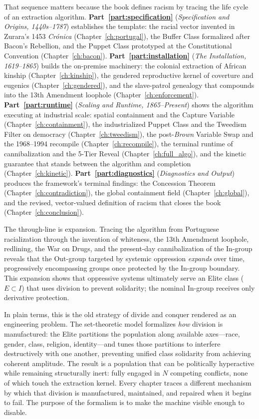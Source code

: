 \documentclass[12pt,openany]{book}
\numberwithin{equation}{chapter}
\begin{document}
That sequence matters because the book defines racism by tracing the life cycle of an extraction algorithm. \textbf{Part~\ref{part:specification}} (\textit{Specification and Origins, 1440s--1787}) establishes the template: the racial vector invented in Zurara's 1453 \textit{Crónica} (Chapter~\ref{ch:portugal}), the Buffer Class formalized after Bacon's Rebellion, and the Puppet Class prototyped at the Constitutional Convention (Chapter~\ref{ch:bacon}). \textbf{Part~\ref{part:installation}} (\textit{The Installation, 1619--1865}) builds the on-premise machinery: the colonial extraction of African kinship (Chapter~\ref{ch:kinship}), the gendered reproductive kernel of coverture and eugenics (Chapter~\ref{ch:gendered}), and the slave-patrol genealogy that compounds into the 13th Amendment loophole (Chapter~\ref{ch:enforcement}). \textbf{Part~\ref{part:runtime}} (\textit{Scaling and Runtime, 1865--Present}) shows the algorithm executing at industrial scale: spatial containment and the Capture Variable (Chapter~\ref{ch:containment}), the industrialized Puppet Class and the Tweedism Filter on democracy (Chapter~\ref{ch:tweedism}), the post-\textit{Brown} Variable Swap and the 1968--1994 recompile (Chapter~\ref{ch:recompile}), the terminal runtime of cannibalization and the 5-Tier Reveal (Chapter~\ref{ch:full_algo}), and the kinetic guarantee that stands between the algorithm and completion (Chapter~\ref{ch:kinetic}). \textbf{Part~\ref{part:diagnostics}} (\textit{Diagnostics and Output}) produces the framework's terminal findings: the Concession Theorem (Chapter~\ref{ch:contradiction}), the global containment field (Chapter~\ref{ch:global}), and the revised, vector-valued definition of racism that closes the book (Chapter~\ref{ch:conclusion}).

The through-line is expansion. Tracing the algorithm from Portuguese racialization through the invention of whiteness, the 13th Amendment loophole, redlining, the War on Drugs, and the present-day cannibalization of the In-group reveals that the Out-group targeted by systemic oppression \textit{expands} over time, progressively encompassing groups once protected by the In-group boundary. This expansion shows that oppressive systems ultimately serve an Elite class ($E \subset I$) that uses division to prevent solidarity; the nominal In-group receives only derivative protection.

In plain terms, this is the old strategy of divide and conquer rendered as an engineering problem. The set-theoretic model formalizes \textit{how} division is manufactured: the Elite partitions the population along available axes---race, gender, class, religion, identity---and tunes those partitions to interfere destructively with one another, preventing unified class solidarity from achieving coherent amplitude. The result is a population that can be politically hyperactive while remaining structurally inert: fully engaged in $N$ competing conflicts, none of which touch the extraction kernel. Every chapter traces a different mechanism by which that division is manufactured, maintained, and repaired when it begins to fail. The purpose of the formalism is to make the machine visible enough to disable.
\end{document}
